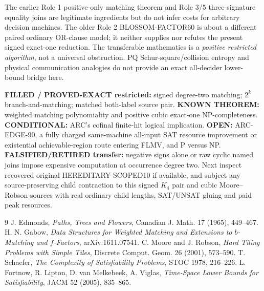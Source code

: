 \documentclass[11pt]{article}
\begin{document}
The earlier Role 1 positive-only matching theorem and Role 3/5 three-signature equality joins are legitimate ingredients but do not infer costs for arbitrary decision machines. The older Role 2 BLOSSOM-FACTOR60 is about a different paired ordinary OR-clause model; it neither supplies nor refutes the present signed exact-one reduction. The transferable mathematics is a \emph{positive restricted algorithm}, not a universal obstruction. PQ Schur-square/collision entropy and physical communication analogies do not provide an exact all-decider lower-bound bridge here.

\textbf{FILLED / PROVED-EXACT restricted:} signed degree-two matching; $2^k$ branch-and-matching; matched both-label source pair. \textbf{KNOWN THEOREM:} weighted matching polynomiality and positive cubic exact-one NP-completeness. \textbf{CONDITIONAL:} ARC's cofinal finite-hit logical implication. \textbf{OPEN:} ARC-EDGE-90, a fully charged same-machine all-input SAT resource improvement or existential achievable-region route entering FLMV, and P versus NP. \textbf{FALSIFIED/RETIRED transfer:} negative signs alone or raw cyclic named joins impose expensive computation at occurrence degree two. Next inspect recovered original HEREDITARY-SCOPED10 if available, and subject any source-preserving child contraction to this signed $K_4$ pair and cubic Moore--Robson sources with real ordinary child lengths, SAT/UNSAT gluing and paid peak resources.

\begin{thebibliography}{9}
 J. Edmonds, \emph{Paths, Trees and Flowers}, Canadian J. Math. 17 (1965), 449--467.
 H. N. Gabow, \emph{Data Structures for Weighted Matching and Extensions to $b$-Matching and $f$-Factors}, arXiv:1611.07541.
 C. Moore and J. Robson, \emph{Hard Tiling Problems with Simple Tiles}, Discrete Comput. Geom. 26 (2001), 573--590.
 T. Schaefer, \emph{The Complexity of Satisfiability Problems}, STOC 1978, 216--226.
 L. Fortnow, R. Lipton, D. van Melkebeek, A. Viglas, \emph{Time-Space Lower Bounds for Satisfiability}, JACM 52 (2005), 835--865.
\end{thebibliography}
\end{document}
